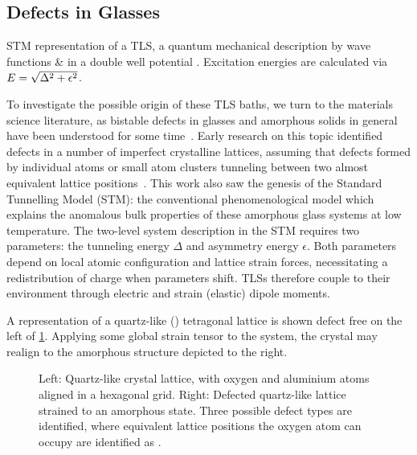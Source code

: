 \subsection{Defects in Glasses}

\begin{marginfigure}
\resizebox{\marginparwidth}{!}{}
\caption[STM Picture of a TLS]{\label{fig:stmtls}STM representation of a TLS, a quantum mechanical description by wave functions  \&  in a double well potential . Excitation energies are calculated via $\cramped{E = \sqrt{\Delta^2+\epsilon^2}}$.}
\end{marginfigure}

To investigate the possible origin of these TLS baths, we turn to the materials science literature, as bistable defects in glasses and amorphous solids in general have been understood for some time~\cite{Zachariasen1932,Anderson1972}.
Early research on this topic identified defects in a number of imperfect crystalline lattices, assuming that defects formed by individual atoms or small atom clusters tunneling between two almost equivalent lattice positions~\cite{Anderson1972,Phillips1972}.
This work also saw the genesis of the Standard Tunnelling Model (STM): the conventional phenomenological  model which explains the anomalous bulk properties of these amorphous glass systems at low temperature.
The two-level system description in the STM requires two parameters: the tunneling energy $\Delta$ and asymmetry energy $\epsilon$.
Both parameters depend on local atomic configuration and lattice strain forces, necessitating a redistribution of charge when parameters shift.
TLSs therefore couple to their environment through electric and strain (elastic) dipole moments.

A representation of a quartz-like () tetragonal lattice is shown defect free on the left of \cref{fig:sio2}.
Applying some global strain tensor to the system, the crystal may realign to the amorphous structure depicted to the right.
\begin{figure}[htp]
\widefiguremargins
\begin{adjustwidth}{\leftwidth}{\rightwidth}
\resizebox{\widefigure}{!}{}
\caption[Quartz-like Crystal Lattice, Pure and Defected]{\label{fig:sio2}Left: Quartz-like crystal lattice, with oxygen \resizebox{!}{0.6em}{} and aluminium \resizebox{!}{0.6em}{} atoms aligned in a hexagonal grid. Right: Defected quartz-like lattice strained to an amorphous state. Three possible defect types are identified, where equivalent lattice positions the oxygen atom can occupy are identified as \resizebox{!}{0.6em}{}.}
\end{adjustwidth}
\end{figure}

